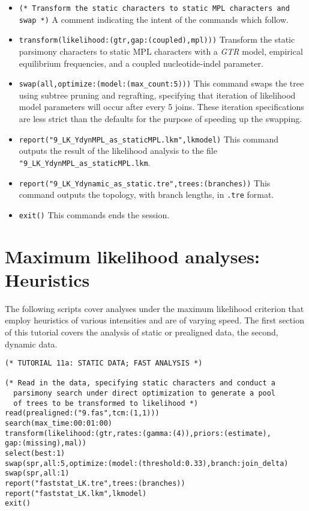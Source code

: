 \begin{itemize}
\item \texttt{(* Transform the static characters to static MPL characters and swap *)} A comment indicating the 
intent of the commands which follow.
\item \texttt{transform(likelihood:(gtr,gap:(coupled),mpl)))} Transform the static parsimony characters to static 
MPL characters with a \emph{GTR} model, empirical equilibrium frequencies, and a coupled nucleotide-indel 
parameter.
\item \texttt{swap(all,optimize:(model:(max\_count:5)))} This command swaps the tree using subtree pruning and 
regrafting, specifying that iteration of likelihood model parameters will occur after every 5 joins. These iteration 
specifications are less strict than the defaults for the purpose of speeding up the swapping.
\item \texttt{report("9\_LK\_YdynMPL\_as\_staticMPL.lkm",lkmodel)} This command outputs the result of 
the likelihood analysis to the file \texttt{"9\_LK\_YdynMPL\_as\_staticMPL.lkm}.
\item \texttt{report("9\_LK\_Ydynamic\_as\_static.tre",trees:(branches))} This command outputs the topology, 
with branch lengths, in \texttt{.tre} format.
\item \texttt{exit()} This commands ends the \poy session.
\end{itemize}


\section{Maximum likelihood analyses: Heuristics}{\label{tutorial13}}
The following scripts cover analyses under the maximum likelihood criterion that employ heuristics of various intensities
and are of varying speed. The first section of this tutorial covers the analysis of static or prealigned data, the second, 
dynamic data. %
\begin{verbatim}
(* TUTORIAL 11a: STATIC DATA; FAST ANALYSIS *) 

(* Read in the data, specifying static characters and conduct a 
  parsimony search under direct optimization to generate a pool 
  of trees to be transformed to likelihood *)
read(prealigned:("9.fas",tcm:(1,1)))
search(max_time:00:01:00)
transform(likelihood:(gtr,rates:(gamma:(4)),priors:(estimate),
gap:(missing),mal))
select(best:1)
swap(spr,all:5,optimize:(model:(threshold:0.33),branch:join_delta)
swap(spr,all:1)
report("faststat_LK.tre",trees:(branches))
report("faststat_LK.lkm",lkmodel)
exit()
\end{verbatim}

